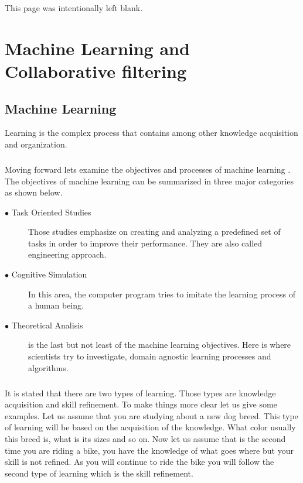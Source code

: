 \newpage
\begin{center}
	This page was intentionally left blank.
\end{center}
\newpage
\chapter{Machine Learning and Collaborative filtering}
\section{Machine Learning} Learning is the complex process that contains among other knowledge acquisition and organization.

\paragraph{}Moving forward lets examine the objectives and processes of machine learning \cite{carbonell1983overview}. The objectives of machine learning can be summarized in three major categories as shown below.

\begin{description}
	\item[$\bullet$ Task Oriented Studies] Those studies emphasize on creating and analyzing a predefined set of tasks in order to improve their performance. They are also called engineering approach.
	\item[$\bullet$ Cognitive Simulation] In this area, the computer program tries to imitate the learning process of a human being.
	\item[$\bullet$ Theoretical Analisis] is the last but not least of the machine learning objectives. Here is where scientists try to investigate, domain agnostic learning processes and algorithms.
\end{description}

\paragraph{} It is stated that there are two types of learning. Those types are knowledge acquisition and skill refinement. To make things more clear let us give some examples. Let us assume that you are studying about a new dog breed. This type of learning will be based on the acquisition of the knowledge. What color usually this breed is, what is its sizes and so on. Now let us assume that is the second time you are riding a bike, you have the knowledge of what goes where but your skill is not refined. As you will continue to ride the bike you will follow the second type of learning which is the skill refinement.


